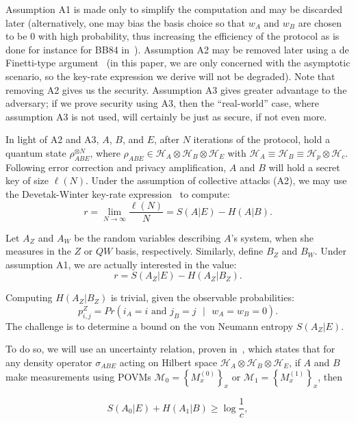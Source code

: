 Assumption A1 is made only to simplify the computation and may be discarded later (alternatively, one may bias the basis choice so that $w_A$ and $w_B$ are chosen to be $0$ with high probability, thus increasing the efficiency of the protocol as is done for instance for BB84 in~\cite{lo:cha:ard:05}).  Assumption A2 may be removed later using a de Finetti-type argument~\cite{ren:gis:kra:05,chr:kon:ren:09,ren:07} (in this paper, we are only concerned with the asymptotic scenario, so the key-rate expression we derive will not be degraded). Note that removing A2 gives us the security. Assumption A3 gives greater advantage to the adversary; if we prove security using A3, then the ``real-world'' case, where assumption A3 is not used, will certainly be just as secure, if not even more.

In light of A2 and A3, $A$, $B$, and $E$, after $N$ iterations of the protocol, hold a quantum state $\rho_{ABE}^{\otimes N}$, where $\rho_{ABE} \in \mathcal{H}_A\otimes\mathcal{H}_B\otimes\mathcal{H}_E$ with $\mathcal{H}_A \equiv \mathcal{H}_B \equiv \mathcal{H}_p\otimes\mathcal{H}_c$.  Following error correction and privacy amplification, $A$ and $B$ will hold a secret key of size $\ell(N)$.  Under the assumption of collective attacks (A2), we may use the Devetak-Winter key-rate expression~\cite{dev:win:05} to compute:
\[
r = \lim_{N\rightarrow \infty}\frac{\ell(N)}{N} = S(A|E) - H(A|B).
\]

Let $A_Z$ and $A_W$ be the random variables describing $A$'s system, when she measures in the $Z$ or $QW$ basis, respectively.  Similarly, define $B_Z$ and $B_W$.  Under assumption A1, we are actually interested in the value:
\[
r = S(A_Z|E) - H(A_Z|B_Z).
\]

Computing $H(A_Z|B_Z)$ is trivial, given the observable probabilities:
%
\begin{equation}\label{eq:prot1:probZ}
p^Z_{i,j} = Pr(i_A=i \text{ and } j_B=j \text{ } | \text{ } w_A=w_B=0).
\end{equation}
%
The challenge is to determine a bound on the von Neumann entropy $S(A_Z|E)$.

To do so, we will use an uncertainty relation, proven in~\cite{ber:chr:col:ren:ren:10}, which states that for any density operator $\sigma_{ABE}$ acting on Hilbert space $\mathcal{H}_A\otimes\mathcal{H}_B\otimes\mathcal{H}_E$, if $A$ and $B$ make measurements using POVMs $\mathcal{M}_0 = \left\{M_x^{(0)}\right\}_x$ or $\mathcal{M}_1 = \left\{M_x^{(1)}\right\}_x$, then

\begin{equation}
S(A_0|E) + H(A_1|B) \ge \log\frac{1}{c},
\end{equation}

